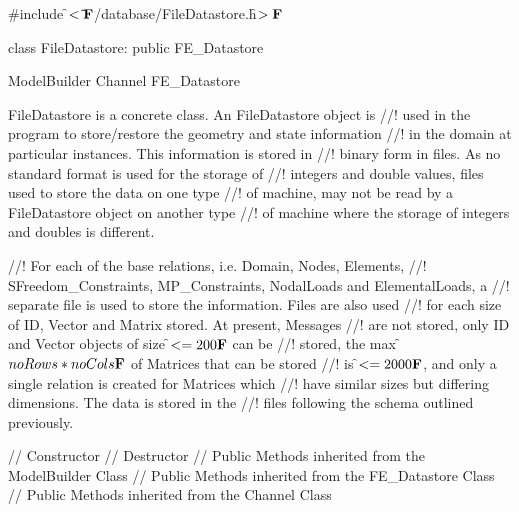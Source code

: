 
\indent \#include \f$<\tilde{ }{\bf F}$/database/FileDatastore.h\f$>{\bf F}$

\indent class FileDatastore: public FE\_Datastore

\indent ModelBuilder
\indent Channel
\indent\indent FE\_Datastore
\indent\indent{}

\indent FileDatastore is a concrete class. An FileDatastore object is
//! used in the program to store/restore the geometry and state information 
//! in the domain at particular instances. This information is stored in
//! binary form in files. As no standard format is used for the storage of
//! integers and double values, files used to store the data on one type
//! of machine, may not be read by a FileDatastore object on another type
//! of machine where the storage of integers and doubles is different.

//! For each of the base relations, i.e. Domain, Nodes, Elements,
//! SFreedom\_Constraints, MP\_Constraints, NodalLoads and ElementalLoads, a
//! separate file is used to store the information. Files are also used
//! for each size of ID, Vector and Matrix stored. At present, Messages
//! are not stored, only ID and Vector objects of size \f$<= 200{\bf F}$ can be
//! stored, the max \f$noRows * noCols{\bf F}$ of Matrices that can be stored
//! is \f$<= 2000{\bf F}$, and only a single relation is created for Matrices which
//! have similar sizes but differing dimensions. The data is stored in the
//! files following the schema outlined previously.


\indent // Constructor
\indent // Destructor
\indent // Public Methods  inherited from the ModelBuilder Class
\indent // Public Methods  inherited from the FE\_Datastore Class
\indent// Public Methods  inherited from the Channel Class
		
